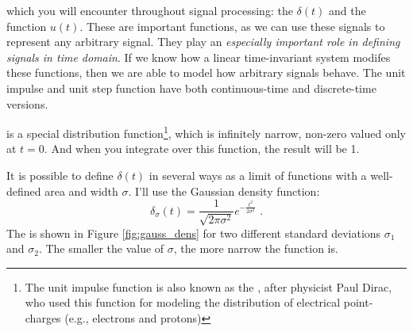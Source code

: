 %
% 
%
 which you will encounter
throughout signal processing: the \emph{} $\delta(t)$ and the \emph{}
function $u(t)$. These are important functions, as we can use these
signals to represent any arbitrary signal. They play an \emph{especially
important role in defining signals in time domain}. If we know how a
linear time-invariant system modifes these functions, then we are able
to model how arbitrary signals behave. The unit impulse and unit step
function have both continuous-time and discrete-time versions.


 is a special distribution
function\footnote{The unit impulse function is also known as the
  \emph{}, after physicist Paul Dirac,
  who used this function for modeling the distribution of electrical point-charges (e.g., electrons and protons)},
which is infinitely narrow, non-zero valued only at $t=0$.
And when you integrate over this function, the result will be 1.

It is possible to define $\delta(t)$ in several ways as a limit of
functions with a well-defined area and width $\sigma$.  I'll use the
Gaussian density function:
\begin{equation}
  \delta_\sigma(t) = \frac{1}{\sqrt{2\pi \sigma^2}}e^{-\frac{t^2}{2\sigma^2}}\,\,.
\end{equation}
The  is shown in Figure \ref{fig:gauss_dens} for
two different standard deviations $\sigma_1$ and $\sigma_2$.
The smaller the value of $\sigma$, the more narrow the function is.

